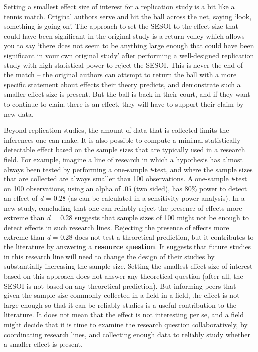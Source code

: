 \documentclass[
  oneside]{book}
\begin{document}
Setting a smallest effect size of interest for a replication study is a bit like a tennis match. Original authors serve and hit the ball across the net, saying `look, something is going on'. The approach to set the SESOI to the effect size that could have been significant in the original study is a return volley which allows you to say `there does not seem to be anything large enough that could have been significant in your own original study' after performing a well-designed replication study with high statistical power to reject the SESOI. This is never the end of the match -- the original authors can attempt to return the ball with a more specific statement about effects their theory predicts, and demonstrate such a smaller effect size is present. But the ball is back in their court, and if they want to continue to claim there is an effect, they will have to support their claim by new data.

Beyond replication studies, the amount of data that is collected limits the inferences one can make. It is also possible to compute a minimal statistically detectable effect based on the sample sizes that are typically used in a research field. For example, imagine a line of research in which a hypothesis has almost always
been tested by performing a one-sample \emph{t}-test, and where the sample sizes that are collected are always smaller than 100 observations. A one-sample \emph{t}-test on 100 observations, using an alpha of .05 (two sided), has 80\% power to detect an effect of \emph{d} = 0.28 (as can be calculated in a sensitivity power analysis). In a new study, concluding that one can reliably reject the presence of effects more extreme than \emph{d} = 0.28 suggests that sample sizes of 100 might not be enough to detect effects in such research lines. Rejecting the presence of effects more extreme than \emph{d} = 0.28 does not test a theoretical prediction, but it contributes to the literature by answering a \textbf{resource question}. It suggests that future studies in this research line will need to change the design of their studies by substantially increasing the sample size. Setting the smallest effect size of interest based on this approach does not answer any theoretical question (after all, the SESOI is not based on any
theoretical prediction). But informing peers that given the sample size commonly collected in a field in a field, the effect is not large enough so that it can be reliably studies is a useful contribution to the literature. It does not mean that the effect is not interesting per se, and a field might decide that it is time to examine the research question collaboratively, by coordinating research lines, and collecting enough data to reliably study whether a smaller effect is present.
\end{document}
